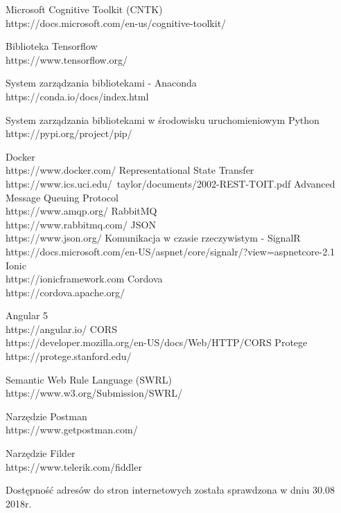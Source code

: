 \begin{thebibliography}{1}
 Microsoft Cognitive Toolkit (CNTK)
\\
https://docs.microsoft.com/en-us/cognitive-toolkit/

 Biblioteka Tensorflow
\\
https://www.tensorflow.org/

 System zarządzania bibliotekami - Anaconda
\\
https://conda.io/docs/index.html

 System zarządzania bibliotekami w środowisku uruchomieniowym Python
\\
https://pypi.org/project/pip/


 Docker
\\
https://www.docker.com/
 Representational State Transfer
\\
https://www.ics.uci.edu/~taylor/documents/2002-REST-TOIT.pdf
Advanced Message Queuing Protocol
\\
https://www.amqp.org/
 RabbitMQ
\\
https://www.rabbitmq.com/
 JSON
\\
https://www.json.org/
 Komunikacja w czasie rzeczywistym - SignalR
\\
https://docs.microsoft.com/en-US/aspnet/core/signalr/?view=aspnetcore-2.1
 Ionic
\\
https://ionicframework.com
 Cordova
\\
https://cordova.apache.org/

 Angular 5
\\
https://angular.io/
CORS
\\
https://developer.mozilla.org/en-US/docs/Web/HTTP/CORS
Protege
\\
https://protege.stanford.edu/

Semantic Web Rule Language (SWRL)
\\
https://www.w3.org/Submission/SWRL/

Narzędzie Postman
\\
https://www.getpostman.com/


Narzędzie Filder
\\
https://www.telerik.com/fiddler


\end{thebibliography}

Dostępność adresów do stron internetowych została sprawdzona w dniu 30.08 2018r.